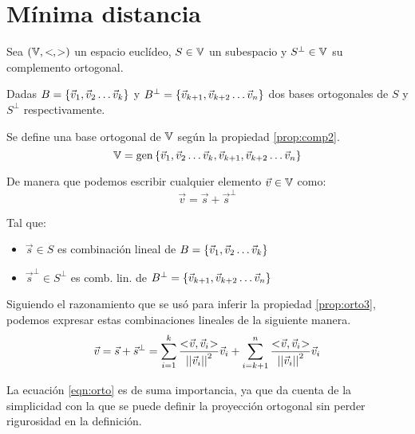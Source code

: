 \documentclass[a5paper,12pt,twoside]{book}
\begin{document}
\section{Mínima distancia}

Sea $(\mathbb{V}, <\hspace{-0.8mm}\,,\,\hspace{-0.8mm}>)$ un espacio euclídeo, $S\in\mathbb{V}$ un subespacio y $S^\perp\in\mathbb{V}$ su complemento ortogonal.

Dadas $B={ \left\{ {\Vec{v}_1 , \Vec{v}_2 \dots \Vec{v}_k} \right\} }$ y $B^\perp = { \left\{ {\Vec{v}_{k+1} , \Vec{v}_{k+2} \dots \Vec{v}_n} \right\} }$ dos bases ortogonales de $S$ y $S^\perp$ respectivamente.

Se define una base ortogonal de $\mathbb{V}$ según la propiedad \ref{prop:comp2}.
\begin{equation*}
    \mathbb{V} = \operatorname{gen} { \left\{ {\Vec{v}_1 , \Vec{v}_2 \dots \Vec{v}_k , \Vec{v}_{k+1} , \Vec{v}_{k+2} \dots \Vec{v}_n} \right\} }
\end{equation*}

De manera que podemos escribir cualquier elemento $\Vec{v}\in\mathbb{V}$ como:
\begin{equation*}
    \Vec{v} = \Vec{s} + \Vec{s}^\perp
\end{equation*}

Tal que:
\begin{itemize}
    \item 
    $\Vec{s} \in S$ es combinación lineal de $B={ \left\{ {\Vec{v}_1 , \Vec{v}_2 \dots \Vec{v}_k} \right\} }$
    
    \item
    $\Vec{s}^\perp \in S^\perp$ es comb. lin. de $B^\perp = { \left\{ {\Vec{v}_{k+1} , \Vec{v}_{k+2} \dots \Vec{v}_n} \right\} }$
\end{itemize}

Siguiendo el razonamiento que se usó para inferir la propiedad \ref{prop:orto3}, podemos expresar estas combinaciones lineales de la siguiente manera.
\begin{equation}
    \Vec{v} = \Vec{s} + \Vec{s}^\perp =
    \sum_{i=1}^k \frac{<\hspace{-0.8mm}\Vec{v},\Vec{v}_i\hspace{-0.8mm}>}{{\left|\left| {\Vec{v}_i} \right|\right|}^2} \Vec{v}_i +
    \sum_{i=k+1}^n \frac{<\hspace{-0.8mm}\Vec{v},\Vec{v}_i\hspace{-0.8mm}>}{{\left|\left| {\Vec{v}_i} \right|\right|}^2} \Vec{v}_i
    \label{eqn:orto}
\end{equation}

La ecuación \ref{eqn:orto} es de suma importancia, ya que da cuenta de la simplicidad con la que se puede definir la proyección ortogonal sin perder rigurosidad en la definición.
\end{document}
